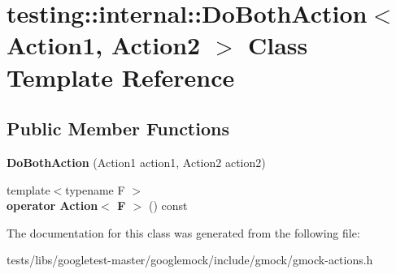 \hypertarget{classtesting_1_1internal_1_1DoBothAction}{}\section{testing\+:\+:internal\+:\+:Do\+Both\+Action$<$ Action1, Action2 $>$ Class Template Reference}
\label{classtesting_1_1internal_1_1DoBothAction}
\subsection*{Public Member Functions}
\begin{DoxyCompactItemize}
\item 
\mbox{\label{classtesting_1_1internal_1_1DoBothAction_a55727c4dbdc1816ba6f1fe124e96088b}} 
{\bfseries Do\+Both\+Action} (Action1 action1, Action2 action2)
\item 
\mbox{\label{classtesting_1_1internal_1_1DoBothAction_a35733e2f117daad110bfbd3de84634a6}} 
{\footnotesize template$<$typename F $>$ }\\{\bfseries operator Action$<$ F $>$} () const
\end{DoxyCompactItemize}


The documentation for this class was generated from the following file\+:\begin{DoxyCompactItemize}
\item 
tests/libs/googletest-\/master/googlemock/include/gmock/gmock-\/actions.\+h\end{DoxyCompactItemize}
